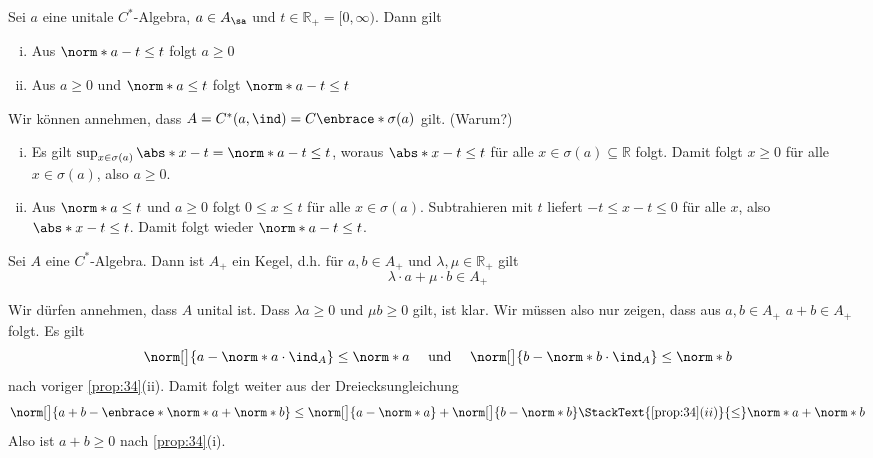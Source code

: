 \begin{proposition}[label=prop:34,{name=[Einfache Abschätzungen für positive Elemente]}]
	Sei $a$ eine unitale $C^*$-Algebra, $a \in A_{\sa}$ und $t \in \mathbb{R}_+ = [0,\infty)$. Dann gilt
	\begin{enumerate}[(i),itemsep=2pt]
		\item Aus $\norm*{a-t}\le t$ folgt $a \ge 0$
		\item Aus $a \ge 0$ und $\norm*{a}\le t$ folgt $\norm*{a-t}\le t$ 
	\end{enumerate}
\end{proposition}
\begin{beweis}
	Wir können annehmen, dass $A=C^*(a,\ind)=C \enbrace*{\sigma(a)}$ gilt. (Warum?)
	\begin{enumerate}[(i),itemsep=2pt]
		\item Es gilt $\sup_{x \in \sigma(a)} \abs*{x-t} = \norm*{a-t} \le t$, woraus $\abs*{x-t} \le t $ für alle $x \in \sigma(a)\subseteq \mathbb{R}$ folgt. Damit folgt
		$x \ge 0$ für alle $x \in \sigma(a)$, also $a \ge 0$.
		\item Aus $\norm*{a}\le t$ und $a \ge 0$ folgt $0 \le x \le t$ für alle $x \in \sigma(a)$. 
		Subtrahieren mit $t$ liefert $-t \le x-t \le 0$ für alle $x$, also $\abs*{x-t}\le t $. 
		Damit folgt wieder $\norm*{a-t}\le t$. \qedhere
	\end{enumerate}
\end{beweis}

\begin{korollar}[label=korr:35,{name=[Die positiven Elemente bilden einen Kegel]}]
	Sei $A$ eine $C^*$-Algebra. 
	Dann ist $A_+$ ein Kegel, d.h. für $a,b \in A_+$ und $\lambda, \mu \in \mathbb{R}_+$ gilt 
	\[
		\lambda \cdot a + \mu \cdot b \in A_+ 
	\]
\end{korollar}
\begin{beweis}
	Wir dürfen annehmen, dass $A$ unital ist. Dass $\lambda a \ge 0$ und $\mu b  \ge 0$ gilt, ist klar. Wir müssen also nur zeigen, dass aus $a,b\in A_+$ $a+b\in A_+$ folgt. Es gilt
	\begin{align}
		\norm[\big]{a- \norm*{a}\cdot \ind_A} \le \norm*{a} \quad \text{ und } \quad \norm[\big]{b- \norm*{b} \cdot \ind_A} \le \norm*{b}
	\end{align}
	nach voriger \autoref{prop:34}(ii). Damit folgt weiter aus der Dreiecksungleichung
	\[
		\norm[\big]{a+b - \enbrace*{\norm*{a} + \norm*{b}}} \le \norm[\big]{a - \norm*{a}} + \norm[\big]{b - \norm*{b}} \StackText{\ref{prop:34}(ii)}{\le} \norm*{a} + \norm*{b}
	\]
	Also ist $a+b \ge 0$ nach \autoref{prop:34}(i). 
\end{beweis}

